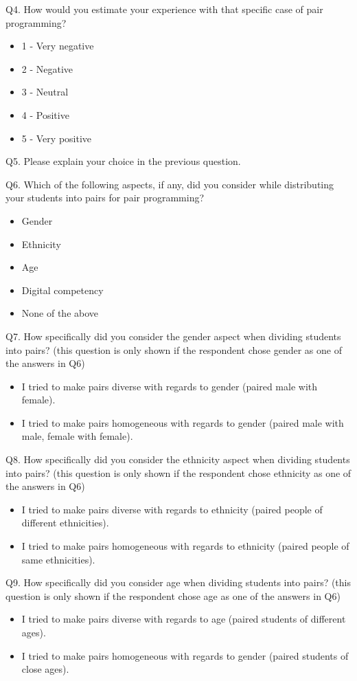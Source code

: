 \documentclass[conference]{IEEEtran}
\begin{document}
Q4. How would you estimate your experience with that specific case of pair programming? 
    \begin{itemize}
        \item 1 - Very negative
        \item 2 - Negative
        \item 3 - Neutral
        \item 4 - Positive
        \item 5 - Very positive
    \end{itemize}
    
Q5. Please explain your choice in the previous question.  

Q6. Which of the following aspects, if any, did you consider while distributing your students into pairs for pair programming?
    \begin{itemize}
        \item Gender
        \item Ethnicity
        \item Age
        \item Digital competency
        \item None of the above
    \end{itemize}

Q7. How specifically did you consider the gender aspect when dividing students into pairs? (this question is only shown if the respondent chose gender as one of the answers in Q6)
    \begin{itemize}
        \item I tried to make pairs diverse with regards to gender (paired male with female).
        \item I tried to make pairs homogeneous with regards to gender (paired male with male, female with female).
    \end{itemize}

Q8. How specifically did you consider the ethnicity aspect when dividing students into pairs? (this question is only shown if the respondent chose ethnicity as one of the answers in Q6)
    \begin{itemize}
        \item I tried to make pairs diverse with regards to ethnicity (paired people of different ethnicities).
        \item I tried to make pairs homogeneous with regards to ethnicity (paired people of same ethnicities).
    \end{itemize}

Q9. How specifically did you consider age when dividing students into pairs? (this question is only shown if the respondent chose age as one of the answers in Q6)
    \begin{itemize}
        \item I tried to make pairs diverse with regards to age (paired students of different ages).
        \item I tried to make pairs homogeneous with regards to gender (paired students of close ages).
    \end{itemize}
\end{document}
